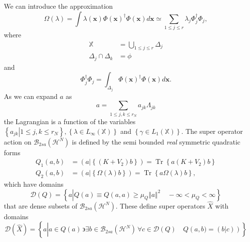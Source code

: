 \documentclass[aps,preprint]{revtex4}%
\begin{document}
We can introduce the approximation
\begin{equation}
\Omega\left(  \lambda\right)  =\int\lambda\left(  \mathbf{x}\right)
\Phi\left(  \mathbf{x}\right)  ^{\dagger}\Phi\left(  \mathbf{x}\right)
d\mathbf{x\simeq}\sum_{1\leq j\leq r}\lambda_{j}\Phi_{j}^{\dagger}\Phi_{j},
\end{equation}
where
\begin{align}
\mathbb{X}  &  \mathbb{=}\bigcup\limits_{1\leq j\leq r}\mathbb{\Delta}_{j}\\
\mathbb{\Delta}_{j}\cap\mathbb{\Delta}_{k}  &  =\phi
\end{align}
and
\begin{equation}
\Phi_{j}^{\dagger}\Phi_{j}=\int_{\mathbb{\Delta}_{j}}\Phi\left(
\mathbf{x}\right)  ^{\dagger}\Phi\left(  \mathbf{x}\right)  d\mathbf{x.}%
\end{equation}
As we can expand $a$ as
\begin{equation}
a=\sum_{1\leq j,k\leq r_{N}}a_{jk}\Lambda_{jk}%
\end{equation}
the Lagrangian is a function of the variables $\left\{  \left.  a_{jk}%
\right\vert 1\leq j,k\leq r_{N}\right\}  ,\left\{  \lambda\in L_{\infty
}\left(  \mathbb{X}\right)  \right\}  $ and $\left\{  \gamma\in L_{1}\left(
\mathbb{X}\right)  \right\}  .$ The super operator action on $\mathcal{B}%
_{2sa}\left(  \mathcal{H}^{N}\right)  $ is defined by the semi bounded
\emph{real }symmetric quadratic forms
\begin{align}
Q_{1}\left(  a,b\right)   &  =\left(  a\left\vert \left\{  \left(
K+V_{2}\right)  b\right\}  \right.  \right)  =\operatorname{Tr}\left\{
a\left(  K+V_{2}\right)  b\right\} \nonumber\\
Q_{2}\left(  a,b\right)   &  =\left(  a\left\vert \left\{  \Omega\left(
\lambda\right)  b\right\}  \right.  \right)  =\operatorname{Tr}\left\{
a\Omega\left(  \lambda\right)  b\right\}  ,
\end{align}
which have domains
\begin{equation}
\mathcal{D}\left(  Q\right)  =\left\{  a\left\vert Q\left(  a\right)  \equiv
Q\left(  a,a\right)  \geq\mu_{Q}\left\Vert a\right\Vert ^{2}\right.
\quad-\infty<\mu_{Q}<\infty\right\}
\end{equation}
that are dense subsets of $\mathcal{B}_{2sa}\left(  \mathcal{H}^{N}\right)  .$
These define super operators $\widehat{X}$ with domains
\begin{equation}
\mathcal{D}\left(  \widehat{X}\right)  =\left\{  a\left\vert \overset{}{a\in
Q\left(  a\right)  \,\backepsilon\exists b\in\mathcal{B}_{2sa}\left(
\mathcal{H}^{N}\right)  \,\forall c\in\mathcal{D}\left(  Q\right)  \quad
Q\left(  a,b)=\left(  \left.  b\right\vert c\right)  \right)  }\right.
\right\}
\end{equation}
\end{document}
